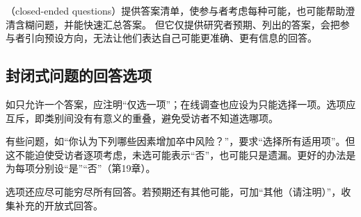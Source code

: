 （closed-ended questions）提供答案清单，使参与者考虑每种可能，也可能帮助澄清含糊问题，并能快速汇总答案。
但它仅提供研究者预期、列出的答案，会把参与者引向预设方向，无法让他们表达自己可能更准确、更有信息的回答。

\subsection{封闭式问题的回答选项}
如只允许一个答案，应注明“仅选一项”；在线调查也应设为只能选择一项。选项应互斥，即类别间没有有意义的重叠，避免受访者不知道选哪项。

有些问题，如“你认为下列哪些因素增加卒中风险？”，要求“选择所有适用项”。但这不能迫使受访者逐项考虑，未选可能表示“否”，也可能只是遗漏。更好的办法是为每项分别设“是”“否”（第19章）。

选项还应尽可能穷尽所有回答。若预期还有其他可能，可加“其他（请注明）”，收集补充的开放式回答。

